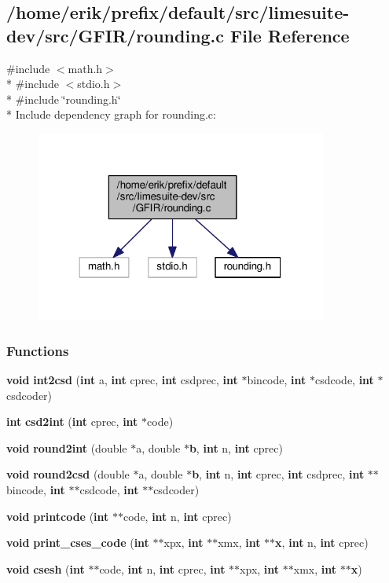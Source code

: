 \subsection{/home/erik/prefix/default/src/limesuite-\/dev/src/\+G\+F\+I\+R/rounding.c File Reference}
\label{rounding_8c}
{\ttfamily \#include $<$math.\+h$>$}\\*
{\ttfamily \#include $<$stdio.\+h$>$}\\*
{\ttfamily \#include \char`\"{}rounding.\+h\char`\"{}}\\*
Include dependency graph for rounding.\+c\+:
\nopagebreak
\begin{figure}[H]
\begin{center}
\leavevmode
\includegraphics[width=272pt]{d4/d31/rounding_8c__incl}
\end{center}
\end{figure}
\subsubsection*{Functions}
\begin{DoxyCompactItemize}
\item 
{\bf void} {\bf int2csd} ({\bf int} a, {\bf int} cprec, {\bf int} csdprec, {\bf int} $\ast$bincode, {\bf int} $\ast$csdcode, {\bf int} $\ast$csdcoder)
\item 
{\bf int} {\bf csd2int} ({\bf int} cprec, {\bf int} $\ast$code)
\item 
{\bf void} {\bf round2int} (double $\ast$a, double $\ast${\bf b}, {\bf int} n, {\bf int} cprec)
\item 
{\bf void} {\bf round2csd} (double $\ast$a, double $\ast${\bf b}, {\bf int} n, {\bf int} cprec, {\bf int} csdprec, {\bf int} $\ast$$\ast$bincode, {\bf int} $\ast$$\ast$csdcode, {\bf int} $\ast$$\ast$csdcoder)
\item 
{\bf void} {\bf printcode} ({\bf int} $\ast$$\ast$code, {\bf int} n, {\bf int} cprec)
\item 
{\bf void} {\bf print\+\_\+cses\+\_\+code} ({\bf int} $\ast$$\ast$xpx, {\bf int} $\ast$$\ast$xmx, {\bf int} $\ast$$\ast${\bf x}, {\bf int} n, {\bf int} cprec)
\item 
{\bf void} {\bf csesh} ({\bf int} $\ast$$\ast$code, {\bf int} n, {\bf int} cprec, {\bf int} $\ast$$\ast$xpx, {\bf int} $\ast$$\ast$xmx, {\bf int} $\ast$$\ast${\bf x})
\end{DoxyCompactItemize}



